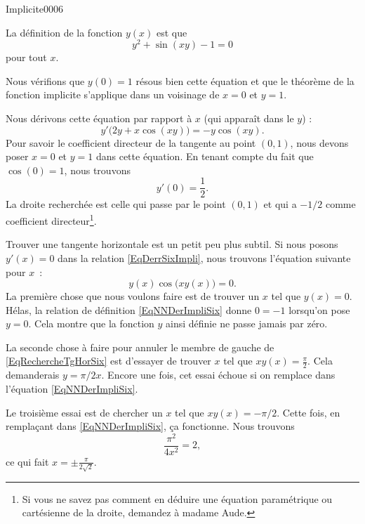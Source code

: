 
\begin{corrige}{Implicite0006}

	La définition de la fonction $y(x)$ est que 
	\begin{equation}		\label{EqNNDerImpliSix}
		y^2+\sin(xy)-1=0
	\end{equation}
	pour tout $x$.
	
	Nous vérifions que $y(0)=1$ résous bien cette équation et que le théorème de la fonction implicite s'applique dans un voisinage de $x=0$ et $y=1$.
	
	Nous dérivons cette équation par rapport à $x$ (qui apparaît dans le $y$) :
	\begin{equation}		\label{EqDerrSixImpli}
		y'\big( 2y+x\cos(xy) \big)=-y\cos(xy).
	\end{equation}
	Pour savoir le coefficient directeur de la tangente au point $(0,1)$, nous devons poser $x=0$ et $y=1$ dans cette équation. En tenant compte du fait que $\cos(0)=1$, nous trouvons
	\begin{equation}
		y'(0)=\frac{1}{ 2 }.
	\end{equation}
	La droite recherchée est celle qui passe par le point $(0,1)$ et qui a $-1/2$ comme coefficient directeur\footnote{Si vous ne savez pas comment en déduire une équation paramétrique ou cartésienne de la droite, demandez à madame Aude.}.

	Trouver une tangente horizontale est un petit peu plus subtil. Si nous posons $y'(x)=0$ dans la relation \eqref{EqDerrSixImpli}, nous trouvons l'équation suivante pour $x$~:
	\begin{equation}		\label{EqRechercheTgHorSix}
		y(x)\cos\big( xy(x) \big)=0.
	\end{equation}
	La première chose que nous voulons faire est de trouver un $x$ tel que $y(x)=0$. Hélas, la relation de définition \eqref{EqNNDerImpliSix} donne $0=-1$ lorsqu'on pose $y=0$. Cela montre que la fonction $y$ ainsi définie ne passe jamais par zéro.

	La seconde chose à faire pour annuler le membre de gauche de \eqref{EqRechercheTgHorSix} est d'essayer de trouver $x$ tel que $xy(x)=\frac{ \pi }{ 2 }$. Cela demanderais $y=\pi/2x$. Encore une fois, cet essai échoue si on remplace dans l'équation \eqref{EqNNDerImpliSix}.

	Le troisième essai est de chercher un $x$ tel que $xy(x)=-\pi/2$. Cette fois, en remplaçant dans \eqref{EqNNDerImpliSix}, ça fonctionne. Nous trouvons
	\begin{equation}
		\frac{ \pi^2 }{ 4x^2 }=2, 
	\end{equation}
	ce qui fait $x=\pm\frac{ \pi }{ 2\sqrt{2} }$.


\end{corrige}
